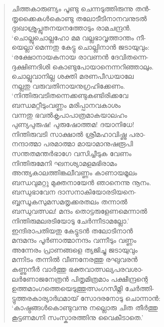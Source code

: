 \begin{verse}
ചിത്തകാരുണ്യം പൂണ്ടു ചെന്നടുത്തിരുന്നു തന്‍-\\
തൃക്കൈകള്‍കൊണ്ടു തലോടീടിനാനവനുടല്‍\\
ദുഃഖാശ്രുപ്ലുതനയനത്തോടും രാമചന്ദ്രന്‍.\\
‘ചൊല്ലുചൊല്ലഹോ മമ വല്ലഭാവൃത്താന്തം നീ-\\
യെല്ലാ’മെന്നതു കേട്ടു ചൊല്ലിനാന്‍ ജടായുവും:\\
‘രക്ഷോനായകനായ രാവണന്‍ ദേവിതന്നെ-\\
ദ്ദക്ഷിണദിശി കൊണ്ടുപോയാനെന്നറിഞ്ഞാലും.\\
ചൊല്ലുവാനില്ല ശക്തി മരണപീഡയാലേ\\
നല്ലതു വരുവതിനായനുഗ്രഹിക്കേണം.\\
‘നിന്തിരുവടിതന്നെക്കണ്ടുകണ്ടിരിക്കവേ\\
ബന്ധമറ്റീടുംവണ്ണം മരിപ്പാനവകാശം\\
വന്നതു ഭവല്‍കൃപാപാത്രമാകയാലഹം\\
പുണ്യപുരുഷ! പുരുഷോത്തമ! ദയാനിധേ!\\
നിന്തിരുവടി സാക്ഷാല്‍ ശ്രീമഹാവിഷ്ണു പരാ-\\
നന്ദാത്മാ പരമാത്മാ മായാമാനുഷരൂപി\\
സന്തതമന്തര്‍ഭാഗേ വസിച്ചീടുക വേണം\\
നിന്തിരുമേനി ഘനശ്യാമളമഭിരാമം\\
അന്ത്യകാലത്തിങ്കലീവണ്ണം കാണായമൂലം\\
ബന്ധവുമറ്റു മുക്തനായേന്‍ ഞാനെന്നു നൂനം.\\
ബന്ധുഭാവേന ദാസനാകിയോരടിയനെ-\\
ബ്ബന്ധൂകസുമസമതൃക്കരതലം തന്നാല്‍\\
ബന്ധുവത്സല! മന്ദം തൊട്ടരുളേണമെന്നാല്‍\\
നിന്തിരുമലരടിയോടു ചേര്‍ന്നീടാമല്ലോ.’\\
ഇന്ദിരാപതിയതു കേട്ടുടന്‍ തലോടിനാന്‍\\
മന്ദമന്ദം പൂര്‍ണാത്മാനന്ദം വന്നീടും വണ്ണം\\
അന്നേരം പ്രാണങ്ങളെ ത്യജിച്ചു ജടായുവും\\
മന്നിടം തന്നില്‍ വീണനേരത്തു രഘുവരന്‍\\
കണ്ണുനീര്‍ വാര്‍ത്തു ഭക്തവാത്സല്യപരവശാ-\\
ലര്‍ണോജനേത്രന്‍ പിതൃമിത്രമാം പക്ഷീന്ദ്രന്റെ\\
ഉത്തമാംഗത്തെയെടുത്തുത്സംഗസീമ്നി ചേര്‍ത്തി-\\
ട്ടുത്തരകാര്യാര്‍ഥമായ് സോദരനോടു ചൊന്നാന്‍:\\
‘കാഷ്ഠങ്ങള്‍കൊണ്ടുവന്നു നല്ലൊരു ചിത തീര്‍ത്തു\\
കൂട്ടണമഗ്നി സംസ്കാരത്തിനു വൈകീടാതെ.’\\

\end{verse}
